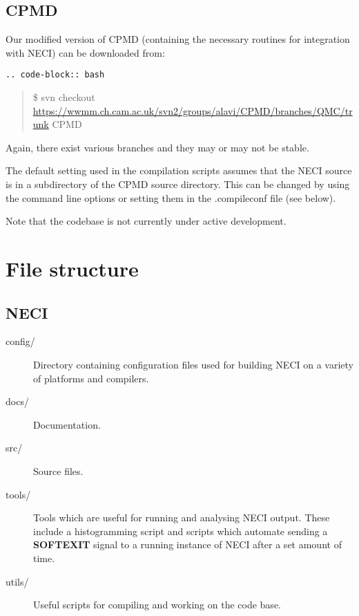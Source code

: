 \documentclass[openany,a4paper,10pt,english]{manual}
\begin{document}
\subsection{CPMD}

Our modified version of CPMD (containing the necessary routines for
integration with NECI) can be downloaded from:

\begin{Verbatim}[commandchars=@\[\]]
.. code-block:: bash
\end{Verbatim}
\begin{quote}

\$ svn checkout \href{https://wwmm.ch.cam.ac.uk/svn2/groups/alavi/CPMD/branches/QMC/trunk}{https://wwmm.ch.cam.ac.uk/svn2/groups/alavi/CPMD/branches/QMC/trunk} CPMD
\end{quote}

Again, there exist various branches and they may or may not be stable.

The default setting used in the compilation scripts assumes that the NECI
source is in a subdirectory of the CPMD source directory.  This can be changed
by using the command line options or setting them in the .compileconf file (see
below).

Note that the codebase is not currently under active development.


\section{File structure}


\subsection{NECI}
\begin{description}
\item[config/] \leavevmode
Directory containing configuration files used for building NECI on a
variety of platforms and compilers.

\item[docs/] \leavevmode
Documentation.

\item[src/] \leavevmode
Source files.

\item[tools/] \leavevmode
Tools which are useful for running and analysing NECI output.  These
include a histogramming script and scripts which automate sending a
\textbf{SOFTEXIT} signal to a running instance of NECI after a set amount
of time.

\item[utils/] \leavevmode
Useful scripts for compiling and working on the code base.

\end{description}
\end{document}
